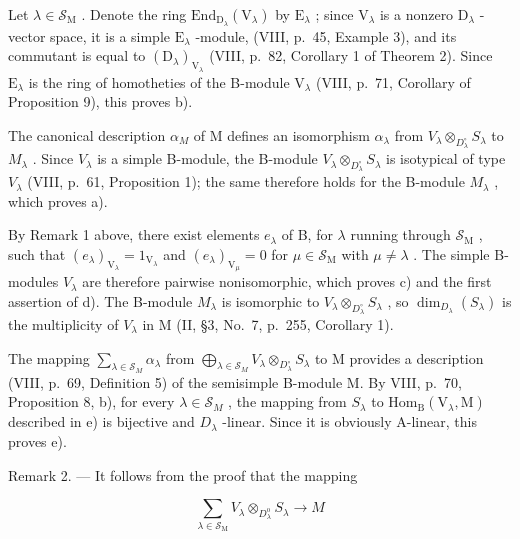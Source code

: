 Let \(\lambda \in \mathcal{S}_{\mathrm{M}}\) . Denote the ring \(\mathrm{End}_{\mathrm{D}_{\lambda}}(\mathrm{V}_{\lambda})\) by \(\mathrm{E}_{\lambda}\) ; since \(\mathrm{V}_{\lambda}\) is a nonzero \(\mathrm{D}_{\lambda}\) -vector space, it is a simple \(\mathrm{E}_{\lambda}\) -module, (VIII, p.~45, Example 3), and its commutant is equal to \((\mathrm{D}_{\lambda})_{\mathrm{V}_{\lambda}}\) (VIII, p.~82, Corollary 1 of Theorem 2). Since \(\mathrm{E}_{\lambda}\) is the ring of homotheties of the B-module \(\mathrm{V}_{\lambda}\) (VIII, p.~71, Corollary of Proposition 9), this proves b).

The canonical description \(\alpha_{M}\) of M defines an isomorphism \(\alpha_{\lambda}\) from \(V_{\lambda}\otimes_{D_{\lambda}^{\circ}}S_{\lambda}\) to \(M_{\lambda}\) . Since \(V_{\lambda}\) is a simple B-module, the B-module \(V_{\lambda}\otimes_{D_{\lambda}^{\circ}}S_{\lambda}\) is isotypical of type \(V_{\lambda}\) (VIII, p.~61, Proposition 1); the same therefore holds for the B-module \(M_{\lambda}\) , which proves a).

By Remark 1 above, there exist elements \(e_{\lambda}\) of B, for \(\lambda\) running through \(\mathcal{S}_{\mathrm{M}}\) , such that \((e_{\lambda})_{\mathrm{V}_{\lambda}} = 1_{\mathrm{V}_{\lambda}}\) and \((e_{\lambda})_{\mathrm{V}_{\mu}} = 0\) for \(\mu \in \mathcal{S}_{\mathrm{M}}\) with \(\mu \neq \lambda\) . The simple B-modules \(V_{\lambda}\) are therefore pairwise nonisomorphic, which proves c) and the first assertion of d). The B-module \(M_{\lambda}\) is isomorphic to \(V_{\lambda} \otimes_{D_{\lambda}^{\circ}} S_{\lambda}\) , so \(\dim_{D_{\lambda}}(S_{\lambda})\) is the multiplicity of \(V_{\lambda}\) in M (II, §3, No.~7, p.~255, Corollary 1).

The mapping \(\sum_{\lambda\in\mathcal{S}_{M}}\alpha_{\lambda}\) from \(\bigoplus_{\lambda\in\mathcal{S}_{M}}V_{\lambda}\otimes_{D_{\lambda}^{\circ}}S_{\lambda}\) to M provides a description (VIII, p.~69, Definition 5) of the semisimple B-module M. By VIII, p.~70, Proposition 8, b), for every \(\lambda\in\mathcal{S}_{M}\) , the mapping from \(S_{\lambda}\) to \(\mathrm{Hom}_{\mathrm{B}}(\mathrm{V}_{\lambda},\mathrm{M})\) described in e) is bijective and \(D_{\lambda}\) -linear. Since it is obviously A-linear, this proves e).

Remark 2. --- It follows from the proof that the mapping

\[
\sum_ {\lambda \in \mathcal {S} _ {\mathrm{M}}} V _ {\lambda} \otimes_ {D _ {\lambda} ^ {\mathrm{o}}} S _ {\lambda} \longrightarrow M
\]

